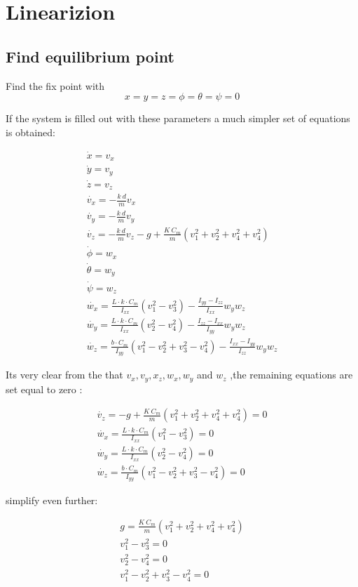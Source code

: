 \section{Linearizion}

\subsection{Find equilibrium point}

Find the fix point with $$x=y=z=\phi=\theta=\psi=0$$

If the system is filled out with these parameters a much simpler set of equations is obtained:

\begin{eqnarray}
\dot{x}=v_x \\
\dot{y}=v_y \\
\dot{z}=v_z \\
\dot{v_x}=-\frac{k \ d}{m}v_x \\
\dot{v_y}=-\frac{k \ d}{m}v_y \\
\dot{v_z}=-\frac{k \ d}{m}v_z -g + \frac{K \ C_m}{m}(v_1^2+v_2^2+v_4^2+v_4^2)\\
\dot{\phi}=w_x \\
\dot{\theta}=w_y \\
\dot{\psi}=w_z \\
\dot{w_x}=\frac{L \cdot k \cdot C_m}{I_{xx}}(v_1^2 - v_3^2) - \frac{I_{yy}-I_{zz}}{I_{xx}} w_y  w_z \\
\dot{w_y}=\frac{L \cdot k \cdot C_m}{I_{xx}}(v_2^2 - v_4^2) - \frac{I_{zz}-I_{xx}}{I_{yy}} w_y  w_z\\
\dot{w_z}=\frac{b \cdot C_m}{I_{yy}}(v_1^2-v_2^2+v_3^2-v_4^2) - \frac{I_{xx}-I_{yy}}{I_{zz}}w_y  w_z
\end{eqnarray}

Its very clear from the that $v_x,v_y,x_z,w_x,w_y$ and $w_z$ ,the remaining equations are set equal to zero :

\begin{eqnarray}
\dot{v_z}= -g + \frac{K \ C_m}{m}(v_1^2+v_2^2+v_4^2+v_4^2) =0\\
\dot{w_x}=\frac{L \cdot k \cdot C_m}{I_{xx}}(v_1^2 - v_3^2) =0 \\
\dot{w_y}=\frac{L \cdot k \cdot C_m}{I_{xx}}(v_2^2 - v_4^2) =0\\
\dot{w_z}=\frac{b \cdot C_m}{I_{yy}}(v_1^2-v_2^2+v_3^2-v_4^2) =0
\end{eqnarray}

simplify even further:

\begin{eqnarray}
g =  \frac{K \ C_m}{m}(v_1^2+v_2^2+v_4^2+v_4^2)\\
v_1^2 - v_3^2 =0 \\
v_2^2 - v_4^2 =0\\
v_1^2-v_2^2+v_3^2-v_4^2 =0
\end{eqnarray}

